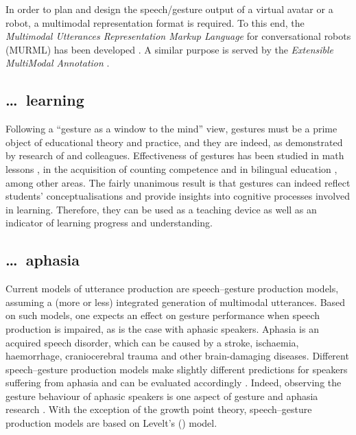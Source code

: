 \documentclass[output=paper,biblatex,babelshorthands,newtxmath,draftmode,colorlinks,citecolor=brown]{langscibook}
\begin{document}
In order to plan and design the speech/gesture output of a virtual avatar or a robot, a multimodal representation format is required.
%
To this end, the \textit{Multimodal Utterances Representation Markup Language} for conversational robots (MURML) has been developed \citep{Kranstedt:Kopp:Wachsmuth:2002:b}.
%
A similar purpose is served by the \textit{Extensible MultiModal Annotation} \citep[EMMA;][]{Johnston:2009}.





\subsection{\ldots\ learning}
\label{sec:learning}

Following a \enquote{gesture as a window to the mind} view, gestures must be a prime object of educational theory and practice, and they are indeed, as demonstrated by research of \citet{Cook:Goldin-Meadow:2006} and colleagues.
%
Effectiveness of gestures has been studied in math lessons \citep{Goldin-Meadow:Nusbaum:Kelly:Wagner:2001}, in the acquisition of counting competence \citep{Alibali:DiRusso:1999} and in bilingual education \citep{Breckinridge-Church:Ayman-Nolley:Mahootian:2004}, among other areas.
%
The fairly unanimous result is that gestures can indeed reflect students' conceptualisations and provide insights into cognitive processes involved in learning.
%
Therefore, they can be used as a teaching device as well as an indicator of learning progress and understanding. 



\subsection{\ldots\ aphasia}
\label{sec:aphasia}

Current models of utterance production are speech--gesture production models, assuming a (more or less) integrated generation of multimodal utterances.
%
Based on such models, one expects an effect on gesture performance when speech production is impaired, as is the case with aphasic speakers. 
%
Aphasia is an acquired speech disorder, which can be caused by a stroke, ischaemia, haemorrhage, craniocerebral trauma and other brain-damaging diseases.
%
Different speech--gesture production models make slightly different predictions for speakers suffering from aphasia and can be evaluated accordingly \citep{deRuiter:deBeer:2013}.
%
Indeed, observing the gesture behaviour of aphasic speakers is one aspect of gesture and aphasia research \citep{Jakob:Bartmann:Goldenberg:Ziegler:Hogrefe:2011,Kong:Law:Chak:2017,Sekine:Rose:2013}.
%
With the exception of the growth point theory, speech--gesture production models are based on Levelt's (\citeyear{Levelt:1989})  model.
\end{document}
